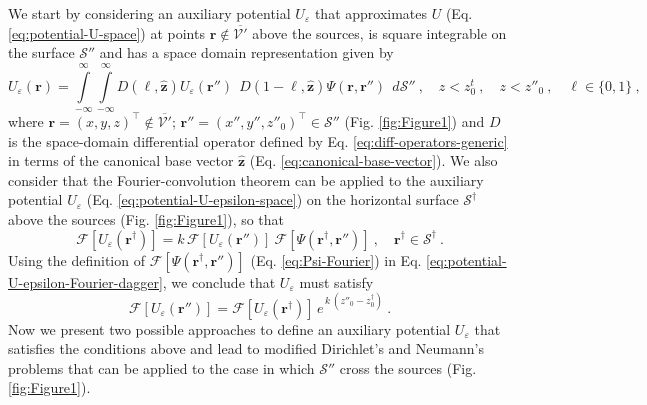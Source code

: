 We start by considering an auxiliary potential $U_{\varepsilon}$ that approximates $U$ (Eq. \ref{eq:potential-U-space})
at points $\mathbf{r} \notin \overline{\mathcal{V}'}$ above the sources, is square integrable on the surface 
$\mathcal{S}''$ and has a space domain representation given by 
\begin{equation}
	U_{\varepsilon}(\mathbf{r}) = 
	\int\limits_{-\infty}^{\infty} \int\limits_{-\infty}^{\infty}
	D(\ell, \hat{\mathbf{z}}) U_{\varepsilon}(\mathbf{r}'') \:\:
	D(1-\ell, \hat{\mathbf{z}}) \Psi(\mathbf{r}, \mathbf{r}'') 
	\:\: d\mathcal{S}'' \: , 
	\quad z < z^{t}_{0} \: , \quad z < z''_{0} \: ,
	\quad \ell \in \{ 0, 1 \} \: ,
	\label{eq:potential-U-epsilon-space}
\end{equation}
where $\mathbf{r} = (x, y, z)^{\top} \notin \overline{\mathcal{V}'}$; 
$\mathbf{r}'' = (x'', y'', z''_{0})^{\top} \in \mathcal{S}''$ (Fig. \ref{fig:Figure1}) and 
$D$ is the space-domain differential operator 
defined by Eq. \ref{eq:diff-operators-generic} in terms of the canonical base vector 
$\hat{\mathbf{z}}$ (Eq. \ref{eq:canonical-base-vector}).
We also consider that the Fourier-convolution theorem 
can be applied to the auxiliary potential $U_{\varepsilon}$
(Eq. \ref{eq:potential-U-epsilon-space}) on the horizontal surface $\mathcal{S}^{\dagger}$ above
the sources (Fig. \ref{fig:Figure1}), so that
\begin{equation}
	\mathcal{F} [ U_{\varepsilon}(\mathbf{r}^{\dagger}) ]
	= k \, \mathcal{F} [ U_{\varepsilon}(\mathbf{r}'') ] \:
	\mathcal{F} [ \Psi(\mathbf{r}^{\dagger}, \mathbf{r}'') ] \: ,
	\quad \mathbf{r}^{\dagger} \in \mathcal{S}^{\dagger} \: .
	\label{eq:potential-U-epsilon-Fourier-dagger}
\end{equation}
Using the definition of $\mathcal{F} [ \Psi(\mathbf{r}^{\dagger}, \mathbf{r}'') ]$ (Eq. \ref{eq:Psi-Fourier})
in Eq. \ref{eq:potential-U-epsilon-Fourier-dagger}, we conclude that $U_{\varepsilon}$ must satisfy
\begin{equation}
	\mathcal{F} [ U_{\varepsilon}(\mathbf{r}'') ] = 
	\mathcal{F} [ U_{\varepsilon}(\mathbf{r}^{\dagger}) ] \, e^{\, k \, (z''_{0} - z^{\dagger}_{0})} \: .
	\label{eq:potential-U-epsilon-Fourier-layer}
\end{equation}
Now we present two possible approaches to define an auxiliary potential $U_{\varepsilon}$ that satisfies the 
conditions above and lead to modified Dirichlet’s and Neumann’s problems that can be applied to 
the case in which $\mathcal{S}''$ cross the sources (Fig. \ref{fig:Figure1}). 

